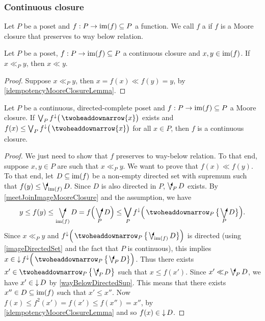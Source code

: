 \subsubsection{Continuous closure}
\begin{definition}
Let $P$ be a poset and $f: P\to \operatorname{im}(f) \subseteq P$ a function. We call $f$ a  if $f$ is a Moore closure that preserves to way below relation.
\end{definition}

\begin{lemma}
Let $P$ be a poset, $f: P\to \operatorname{im}(f) \subseteq P$ a continuous closure and $x,y\in \operatorname{im}(f)$. If $x \ll_P y$, then $x \ll y$.
\end{lemma}
\begin{proof}
Suppose $x\ll_P y$, then $x = f(x) \ll f(y) = y$, by \ref{idempotencyMooreClosureLemma}.
\end{proof}

\begin{proposition} \label{continuousClosureCriterion}
Let $P$ be a continuous, directed-complete poset and $f: P\to \operatorname{im}(f) \subseteq P$ a Moore closure. If $\bigvee_{P} f^\imf\big(\ddownset\{x\}\big)$ exists and $f(x) \leq \bigvee_{P} f^\imf\big(\ddownset\{x\}\big)$ for all $x\in P$, then $f$ is a continuous closure.
\end{proposition}
\begin{proof}
We just need to show that $f$ preserves to way-below relation. To that end, suppose $x,y\in P$ are such that $x\ll_P y$. We want to prove that $f(x) \ll f(y)$. To that end, let $D\subseteq \operatorname{im}(f)$ be a non-empty directed set with supremum such that $f(y) \leq \dirvee_{\im(f)}D$. Since $D$ is also directed in $P$, $\dirvee_P D$ exists. By \ref{meetJoinImageMooreClosure} and the assumption, we have
\[ y \leq f(y) \leq \dirvee_{\im(f)}D = f\Big(\dirvee_{P}D\Big) \leq \bigvee_P f^\imf\Big(\ddownset_P\big\{\dirvee_{P} D\big\}\Big). \]
Since $x\ll_P y$ and $f^\imf\Big(\ddownset_P\big\{\dirvee_{\im(f)} D\big\}\Big)$ is directed (using \ref{imageDirectedSet} and the fact that $P$ is continuous), this implies $x\in \downset f^\imf\Big(\ddownset_P\big\{\dirvee_{P} D\big\}\Big)$. Thus there exists $x'\in \ddownset_P\big\{\dirvee_{P} D\big\}$ such that $x\leq f(x')$. Since $x'\ll_P \dirvee_{P} D$, we have $x'\in \operatorname{\downarrow} D$ by \ref{wayBelowDirectedSup}. This means that there exists $x''\in D\subseteq \operatorname{im}(f)$ such that $x'\leq x''$. Now $f(x) \leq f^2(x') = f(x') \leq f(x'') = x''$, by \ref{idempotencyMooreClosureLemma} and so $f(x) \in \operatorname{\downarrow} D$.
\end{proof}

